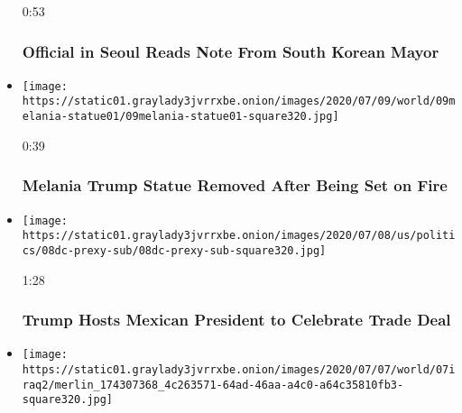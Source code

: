 \begin{itemize}
  0:53

  \hypertarget{official-in-seoul-reads-note-from-south-korean-mayor}{%
  \subsubsection{Official in Seoul Reads Note From South Korean
  Mayor}\label{official-in-seoul-reads-note-from-south-korean-mayor}}
\item
  \href{https://www.nytimes3xbfgragh.onion/video/us/100000007231708/melania-trump-statue-removed-after-being-set-on-fire.html?action=click\&module=video-series-bar\&region=header\&pgtype=Article\&playlistId=video/world}{}

  \texttt{[image: https://static01.graylady3jvrrxbe.onion/images/2020/07/09/world/09melania-statue01/09melania-statue01-square320.jpg]}

  0:39

  \hypertarget{melania-trump-statue-removed-after-being-set-on-fire}{%
  \subsubsection{Melania Trump Statue Removed After Being Set on
  Fire}\label{melania-trump-statue-removed-after-being-set-on-fire}}
\item
  \href{https://www.nytimes3xbfgragh.onion/video/us/100000007230340/trump-hosts-mexican-president-to-celebrate-trade-deal.html?action=click\&module=video-series-bar\&region=header\&pgtype=Article\&playlistId=video/world}{}

  \texttt{[image: https://static01.graylady3jvrrxbe.onion/images/2020/07/08/us/politics/08dc-prexy-sub/08dc-prexy-sub-square320.jpg]}

  1:28

  \hypertarget{trump-hosts-mexican-president-to-celebrate-trade-deal}{%
  \subsubsection{Trump Hosts Mexican President to Celebrate Trade
  Deal}\label{trump-hosts-mexican-president-to-celebrate-trade-deal}}
\item
  \href{https://www.nytimes3xbfgragh.onion/video/us/100000007227750/family-and-friends-mourn-killed-iraqi-analyst.html?action=click\&module=video-series-bar\&region=header\&pgtype=Article\&playlistId=video/world}{}

  \texttt{[image: https://static01.graylady3jvrrxbe.onion/images/2020/07/07/world/07iraq2/merlin\_174307368\_4c263571-64ad-46aa-a4c0-a64c35810fb3-square320.jpg]}


\end{itemize}
